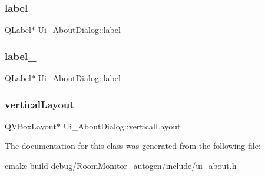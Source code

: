 \subsubsection{\texorpdfstring{label}{label}}
{\footnotesize\ttfamily Q\+Label$\ast$ Ui\+\_\+\+About\+Dialog\+::label}

\mbox{\label{class_ui___about_dialog_ac6edf91dde773e6a40f4c4df9133650d}} 
\subsubsection{\texorpdfstring{label\+\_}{label\_2}}
{\footnotesize\ttfamily Q\+Label$\ast$ Ui\+\_\+\+About\+Dialog\+::label\+\_}

\mbox{\label{class_ui___about_dialog_ad9a707b99263cd8c14df8bc5ea562255}} 
\subsubsection{\texorpdfstring{vertical\+Layout}{verticalLayout}}
{\footnotesize\ttfamily Q\+V\+Box\+Layout$\ast$ Ui\+\_\+\+About\+Dialog\+::vertical\+Layout}



The documentation for this class was generated from the following file\+:\begin{DoxyCompactItemize}
\item 
cmake-\/build-\/debug/\+Room\+Monitor\+\_\+autogen/include/\hyperlink{ui__about_8h}{ui\+\_\+about.\+h}\end{DoxyCompactItemize}
